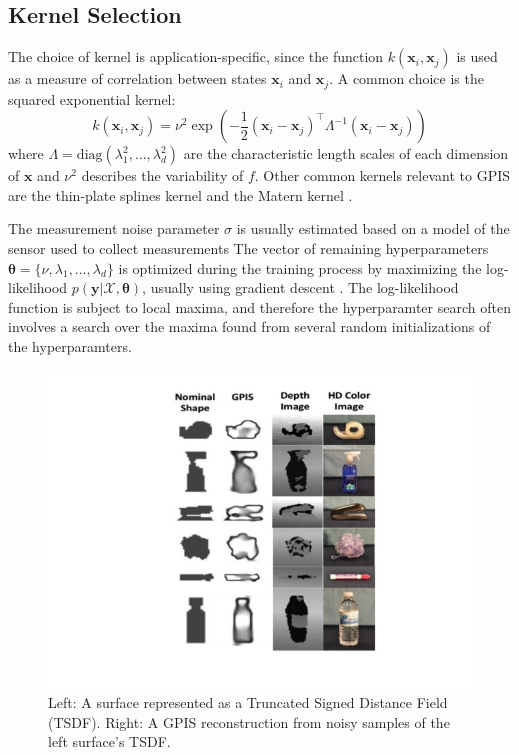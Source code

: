 \documentclass[letterpaper, 10 pt, conference]{ieeeconf}  %
\newcommand{\by}{\mathbf{y}}
\newcommand{\bx}{\mathbf{x}}
\newcommand{\mX}{\mathcal{X}}
\begin{document}
\subsection{Kernel Selection}
The choice of kernel is application-specific, since the function $k(\bx_i,\bx_j)$ is used as a measure of correlation between states $\bx_i$ and $\bx_j$. A common choice is the squared exponential kernel:
\begin{equation}
	k(\bx_i,\bx_j) = \nu^2\exp(-\frac{1}{2}(\bx_i - \bx_j)^{\intercal}\Lambda^{-1}(\bx_i - \bx_j))
\end{equation}
where $\Lambda= \text{diag}(\lambda_1^2,\ldots,\lambda_d^2)$ are the characteristic length scales of each dimension of $\bx$ and $\nu^2$ describes the variability of $f$.
Other common kernels relevant to GPIS are the thin-plate splines kernel \cite{williams2007} and the Matern kernel \cite{bjorkman2013enhancing}.

The measurement noise parameter $\sigma$ is usually estimated based on a model of the sensor used to collect measurements
The vector of remaining hyperparameters $\boldsymbol{\theta} = \{\nu, \lambda_1,\ldots,\lambda_d\}$ is optimized during the training process by maximizing the log-likelihood $p(\by|\mX,\boldsymbol{\theta})$, usually using gradient descent \cite{rasmussen2010gaussian}.
The log-likelihood function is subject to local maxima, and therefore the hyperparamter search often involves a search over the maxima found from several random initializations of the hyperparamters.



\begin{figure}[ht!]
\centering
\includegraphics[scale = 0.3]{figures/Slide03.jpg}
\caption{Left: A surface represented as a Truncated Signed Distance Field (TSDF).
Right: A GPIS reconstruction from noisy samples of the left surface's TSDF.}
\vspace*{-10pt}
\label{fig:GPIS_TSDF}
\end{figure}
\end{document}
